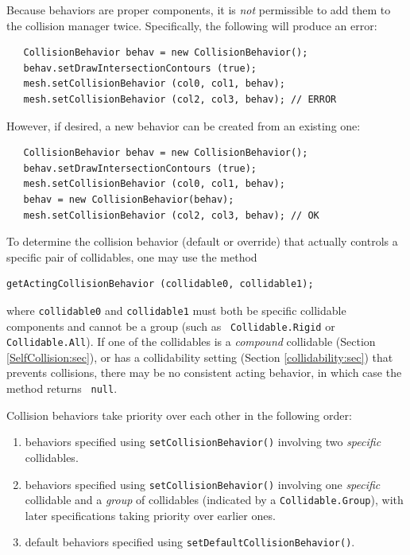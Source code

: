\begin{sideblock}
Because behaviors are proper components, it is {\it not} permissible to
add them to the collision manager twice. Specifically, the following
will produce an error:
\begin{verbatim}
   CollisionBehavior behav = new CollisionBehavior();
   behav.setDrawIntersectionContours (true); 
   mesh.setCollisionBehavior (col0, col1, behav);
   mesh.setCollisionBehavior (col2, col3, behav); // ERROR
\end{verbatim}
However, if desired, a new behavior can be created from an existing
one:
\begin{verbatim}
   CollisionBehavior behav = new CollisionBehavior();
   behav.setDrawIntersectionContours (true); 
   mesh.setCollisionBehavior (col0, col1, behav);
   behav = new CollisionBehavior(behav);
   mesh.setCollisionBehavior (col2, col3, behav); // OK
\end{verbatim}
\end{sideblock}

To determine the collision behavior (default or override) that
actually controls a specific pair of collidables, one may
use the method
%
\begin{lstlisting}[]
  getActingCollisionBehavior (collidable0, collidable1);
\end{lstlisting}
%
where {\tt collidable0} and {\tt collidable1} must both be specific
collidable components and cannot be a group (such as {\tt
Collidable.Rigid} or {\tt Collidable.All}). If one of
the collidables is a {\it compound} collidable (Section
\ref{SelfCollision:sec}), or has a collidability setting (Section
\ref{collidability:sec}) that prevents collisions, there may be no
consistent acting behavior, in which case the method returns {\tt
null}.

Collision behaviors take priority over each other in the following
order:

\begin{enumerate}

\item behaviors specified using {\tt setCollisionBehavior()} involving
two {\it specific} collidables.

\item behaviors specified using {\tt setCollisionBehavior()} involving
one {\it specific} collidable and a {\it group} of collidables
(indicated by a {\tt Collidable.Group}), with later specifications
taking priority over earlier ones.

\item default behaviors specified using {\tt setDefaultCollisionBehavior()}.

\end{enumerate}

